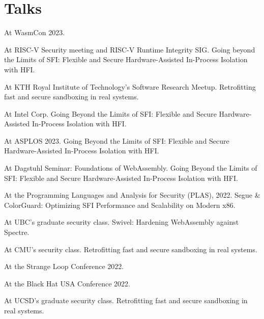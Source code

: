 \section{Talks}

{ At WasmCon 2023. }

{ At RISC-V Security meeting and RISC-V Runtime Integrity SIG. Going beyond the
Limits of SFI: Flexible and Secure Hardware-Assisted In-Process Isolation with
HFI. }

{ At KTH Royal Institute of Technology's Software Research Meetup.
Retrofitting fast and secure sandboxing in real systems.
}

{ At Intel Corp. Going Beyond the Limits of SFI: Flexible and Secure
Hardware-Assisted In-Process Isolation with HFI. }

{ At ASPLOS 2023. Going Beyond the Limits of SFI: Flexible and Secure
Hardware-Assisted In-Process Isolation with HFI. }

{ At Dagstuhl Seminar:
{Foundations of WebAssembly}. Going Beyond the Limits of SFI: Flexible and
Secure Hardware-Assisted In-Process Isolation with HFI. }

{ At the Programming Languages and Analysis for Security (PLAS), 2022. Segue \&
ColorGuard: Optimizing SFI Performance and Scalability on Modern x86. }

{ At UBC's graduate security class. Swivel: Hardening WebAssembly against
Spectre. }

{ At CMU's security class. Retrofitting fast and secure sandboxing in real
systems. }

{ At the Strange Loop Conference 2022.
}

{ At the Black Hat USA Conference 2022.
}

{ At UCSD's graduate security class. Retrofitting fast and secure sandboxing in
real systems. }

